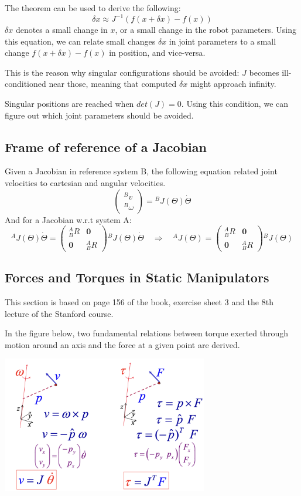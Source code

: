 The theorem can be used to derive the following: 
\[ \delta x \approx J^{-1} (f (x + \delta x) - f (x))  \]
$ \delta x $ denotes a small change in $ x $, or a small change in the robot parameters. Using this equation, we can relate small changes $ \delta x $ in joint parameters to a small change $ f (x+ \delta x) - f (x) $ in position, and vice-versa.

This is the reason why singular configurations should be avoided: $ J $ becomes ill-conditioned near those, meaning that computed $ \delta x $ might approach infinity.

Singular positions are reached when $ det(J) = 0 $. Using this condition, we can figure out which joint parameters should be avoided.

\subsection{Frame of reference of a Jacobian}
Given a Jacobian in reference system B, the following equation related joint velocities to cartesian and angular velocities.
\[ \begin{pmatrix} {}^{B} v\\ {}^{B} \omega \end{pmatrix} = {}^{B} J (\Theta) \dot{\Theta}\]
And for a Jacobian w.r.t system A:
\[ {}^{A} J (\Theta) \dot{\Theta } = 
	\begin{pmatrix} {}^A_B R & \mathbf{0} \\ \mathbf{0} & {}^A_B R \end{pmatrix} {}^B J (\Theta) \dot{\Theta} \quad \Rightarrow \quad {}^A J (\Theta ) = \begin{pmatrix} {}^A_B R & \mathbf{0} \\ \mathbf{0} & {}^A_B R \end{pmatrix} {}^B J (\Theta)  \]

\subsection{Forces and Torques in Static Manipulators}
This section is based on page 156 of the book, exercise sheet 3 and the 8th lecture of the Stanford course.

In the figure below, two fundamental relations between torque exerted through motion around an axis and the force at a given point are derived.

\begin{center}
	\includegraphics[width=9cm]{sections/imgs/4_force_torque.png}
\end{center}

